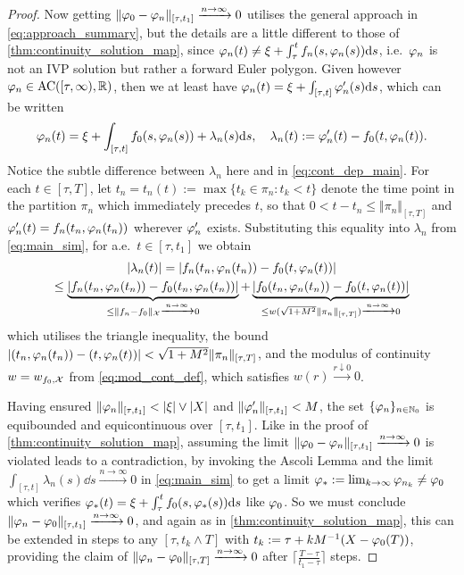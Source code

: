 \begin{proof}
    Now getting $\Vert \varphi_0 - \varphi_n\Vert_{[\tau,t_1]} \xrightarrow{n\to\infty}0$ utilises the general approach in \autoref{eq:approach_summary}, but the details are a little different to those of \autoref{thm:continuity_solution_map}, since $\varphi_n(t)\neq \xi + \int_\tau^t f_n(s,\varphi_n(s))\mathrm{d} s$, i.e.~$\varphi_n$ is not an IVP solution but rather a forward Euler polygon. Given however $\varphi_n\in\mathrm{AC}([\tau,\infty),\mathbb{R})$, then we at least have $\varphi_n(t) = \xi + \int_{[\tau,t]} \varphi'_n(s)\mathrm{d} s$, which can be written
    \begin{equation}\label{eq:main_sim}
        \varphi_n(t) = \xi + \int_{[\tau,t]} f_0(s,\varphi_n(s)) + \lambda_n(s)\mathrm{d} s,\quad \lambda_n(t) := \varphi'_n(t) - f_0(t,\varphi_n(t)).
    \end{equation}
    Notice the subtle difference between $\lambda_n$ here and in \autoref{eq:cont_dep_main}. For each $t\in[\tau,T]$, let $t_n=t_n(t):=\max\{t_k\in\pi_n:t_k<t\}$ denote the time point in the partition $\pi_n$ which immediately precedes $t$, so that $0<t-t_n\le \Vert\pi_{n}\Vert_{[\tau,T]}$ and $\varphi'_n(t)=f_n(t_n,\varphi_n(t_n))$ wherever $\varphi'_n$ exists. Substituting this equality into $\lambda_n$ from \autoref{eq:main_sim}, for a.e.~$t\in[\tau,t_1]$ we obtain
    \begin{multline}\label{eq:lambda_bound}
        |\lambda_n(t)| = |f_n(t_n,\varphi_n(t_n)) - f_0(t,\varphi_n(t))|\\
        \le\underbrace{|f_n(t_n,\varphi_n(t_n)) - f_0(t_n,\varphi_n(t_n))|}_{\le \Vert f_n-f_0\Vert_{\mathcal{X}}\xrightarrow{n\to\infty}0} + \underbrace{|f_0(t_n,\varphi_n(t_n)) - f_0(t,\varphi_n(t)) |}_{\le w(\sqrt{1+M^2}\Vert\pi_{n}\Vert_{[\tau,T]})\xrightarrow{n\to\infty}0}
    \end{multline}
    which utilises the triangle inequality, the bound $|(t_n,\varphi_n(t_n)) - (t,\varphi_n(t)) |<\sqrt{1+M^2}\Vert\pi_{n}\Vert_{[\tau,T]}$, and the modulus of continuity $w=w_{f_0,\mathcal{X}}$ from \autoref{eq:mod_cont_def}, which satisfies $w(r)\xrightarrow{r\downarrow0}0$.

    Having ensured $\Vert\vp_n\Vert_{[\tau,t_1]}<|\xi|\vee|X|$ and $\Vert\varphi'_n\Vert_{[\tau,t_1]}<M$, the set $\{\varphi_n\}_{n\in\mathbb{N}_0}$ is equibounded and equicontinuous over $[\tau,t_1]$. Like in the proof of \autoref{thm:continuity_solution_map}, assuming the limit $\Vert\varphi_0 - \varphi_n\Vert_{[\tau,t_1]}\xrightarrow{n\to\infty}0$ is violated leads to a contradiction, by invoking the Ascoli Lemma and the limit $\int_{[\tau,t]} \lambda_n(s)\dd s\xrightarrow{n\to\infty}0$ in \autoref{eq:main_sim} to get a limit $\varphi_*:=\lim_{k\to\infty}\varphi_{n_k}\neq\varphi_0$ which verifies $\varphi_*(t)= \xi + \int_\tau^t f_0(s,\varphi_*(s))\mathrm{d} s$ like $\varphi_0$. So we must conclude $\Vert\varphi_n-\varphi_0\Vert_{[\tau,t_1]}\xrightarrow{n\to\infty}0$, and again as in \autoref{thm:continuity_solution_map}, this can be extended in steps to any $[\tau,t_k\wedge T]$ with $t_k:=\tau + kM^{-1}(X-\varphi_0(T))$, providing the claim of $\Vert\varphi_n-\varphi_0\Vert_{[\tau,T]}\xrightarrow{n\to\infty}0$ after $\lceil\frac{T-\tau}{t_1-\tau}\rceil$ steps.
\end{proof}

